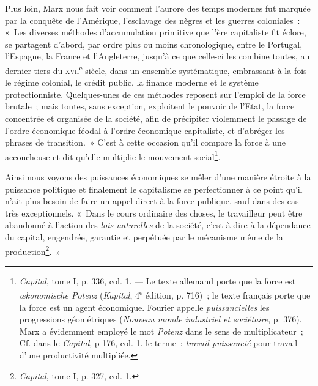 \documentclass[french,twoside]{book} %
\begin{document}
Plus loin, Marx nous fait voir comment l’aurore des temps modernes fut marquée par la conquête de l’Amérique, l’esclavage des nègres et les guerres coloniales : « Les diverses méthodes d’accumulation primitive que l’ère capitaliste fit éclore, se partagent d’abord, par ordre plus ou moins chronologique, entre le Portugal, l’Espagne, la France et l’Angleterre, jusqu’à ce que celle-ci les combine toutes, au dernier tiers du {\scshape xvii}\textsuperscript{e} siècle, dans un ensemble systématique, embrassant à la fois le régime colonial, le crédit public, la finance moderne et le système protectionniste. Quelques-unes de ces méthodes reposent sur l’emploi de la force brutale ; mais toutes, sans exception, exploitent le pouvoir de l’Etat, la force concentrée et organisée de la société, afin de précipiter violemment le passage de l’ordre économique féodal à l’ordre économique capitaliste, et d’abréger les phrases de transition. » C’est à cette occasion qu’il compare la force à une accoucheuse et dit qu’elle multiplie le mouvement social\footnote{ \noindent \emph{Capital}, tome I, p. 336, col. 1. — Le texte allemand porte que la force est \emph{œkonomische Potenz} (\emph{Kapital}, 4\textsuperscript{e} édition, p. 716) ; le texte français porte que la force est un agent économique. Fourier appelle \emph{puissancielles} les progressions géométriques (\emph{Nouveau monde industriel et sociétaire}, p. 376). Marx a évidemment employé le mot \emph{Potenz} dans le sens de multiplicateur ; Cf. dans le \emph{Capital}, p 176, col. 1. le terme : \emph{travail puissancié} pour travail d’une productivité multipliée.
 }.\par
 Ainsi nous voyons des puissances économiques se mêler d’une manière étroite à la puissance politique et finalement le capitalisme se perfectionner à ce point qu’il n’ait plus besoin de faire un appel direct à la force publique, sauf dans des cas très exceptionnels. « Dans le cours ordinaire des choses, le travailleur peut être abandonné à l’action des \emph{lois naturelles} de la société, c’est-à-dire à la dépendance du capital, engendrée, garantie et perpétuée par le mécanisme même de la production\footnote{ \noindent \emph{Capital}, tome I, p. 327, col. 1.
 }. »\par
\end{document}
